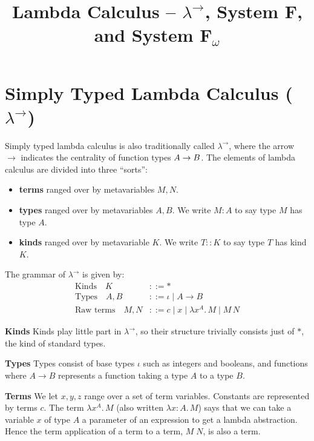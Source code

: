 \documentclass[acmsmall, 9pt]{article}
\begin{document}
\pagestyle{empty} 
 
\title{Lambda Calculus -- $\lambda^{\rightarrow}$, System F, and System F$_\omega$ }
 
\maketitle

\section{Simply Typed Lambda Calculus ($\lambda^{\rightarrow}$)}
Simply typed lambda calculus \cite{cambridge-lambda-calc} is also traditionally called $\lambda^{\rightarrow}$, where the arrow $\rightarrow$ indicates the centrality of function types ${A}\rightarrow{B}$. The elements of lambda calculus are divided into three ``sorts'':
\begin{itemize}
  \item \textbf{terms} ranged over by metavariables $M, N$.
  \item \textbf{types} ranged over by metavariables $A, B$. We write $M: A$ to say type $M$ has type $A$.
  \item \textbf{kinds} ranged over by metavariable $K$. We write $T :: K$ to say type $T$ has kind $K$.
\end{itemize}
\noindent
The grammar of $\lambda^{\rightarrow}$ is given by:
\begin{align*}
  \text{Kinds} \quad K &::= * \\
  \text{Types} \quad  A, B &::= \iota \; | \;  A \rightarrow B  \\
  \text{Raw terms} \quad M, N &::= c \; | \; x \; | \;  \lambda x^A . \, M \; | \; M \, N
\end{align*}

\textbf{Kinds} Kinds play little part in $\lambda^{\rightarrow}$, so their structure trivially consists just of $*$, the kind of standard types.

\textbf{Types} Types consist of base types $\iota$ such as integers and booleans, and functions where $A \rightarrow B$ represents a function taking a type $A$ to a type $B$.

\textbf{Terms} We let $x, y, z$ range over a set of term variables. Constants are represented by terms $c$. The term $\lambda x^A . \, M$ (also written $\lambda x : A . \, M$) says that we can take a variable $x$ of type $A$ a parameter of an expression to get a lambda abstraction. Hence the term application of a term to a term, $M \; N$, is also a term.
\end{document}
